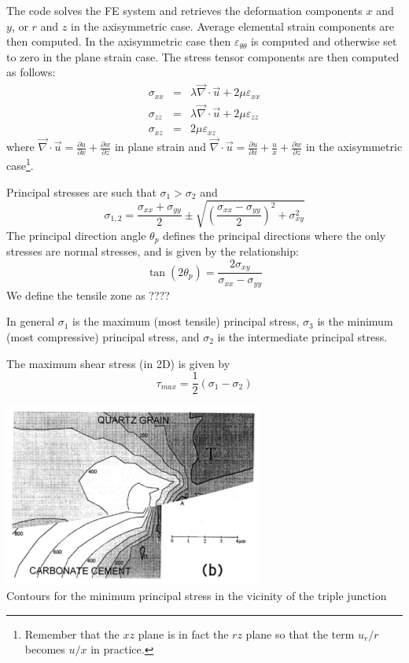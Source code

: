 The code solves the FE system and retrieves the deformation components $x$ and $y$,
or $r$ and $z$ in the axisymmetric case.
Average elemental strain components are then computed. In the axisymmetric case
then  $\varepsilon_{\theta\theta}$ is computed and otherwise set to zero in the plane strain case.
The stress tensor components are then computed as follows:
\begin{eqnarray}
\sigma_{xx} &=& \lambda \vec\nabla\cdot\vec{u} + 2\mu \varepsilon_{xx} \\
\sigma_{zz} &=& \lambda \vec\nabla\cdot\vec{u} + 2\mu \varepsilon_{zz} \\
\sigma_{xz} &=&  2\mu \varepsilon_{xz} 
\end{eqnarray}
where $\vec\nabla\cdot\vec{u}=\frac{\partial u}{\partial x} + \frac{\partial w}{\partial z}$
in plane strain and 
$\vec\nabla\cdot\vec{u}=\frac{\partial u}{\partial x} + \frac{u}{x} + \frac{\partial w}{\partial z}$
in the axisymmetric case\footnote{Remember that the $xz$ plane is in fact the $rz$ plane so that 
the term $u_r/r$ becomes $u/x$ in practice.}.

Principal stresses are such that $\sigma_1>\sigma_2$ and 
\[
\sigma_{1,2}=\frac{\sigma_{xx}+\sigma_{yy}}{2} 
\pm \sqrt{  \left(\frac{\sigma_{xx}-\sigma_{yy}}{2}\right)^2 +\sigma_{xy}^2 }
 \]
The principal direction angle $\theta_p$ defines the principal
directions where the only stresses are normal stresses, and 
is given by the relationship:
\[
\tan (2\theta_p) =  \frac{2 \sigma_{xy}}{\sigma_{xx} -\sigma_{yy}}
\]
We define the tensile zone as ????

In general $\sigma_1$ is the maximum (most tensile) principal stress, 
$\sigma_3$ is the minimum (most compressive) principal stress, 
and $\sigma_2$ is the intermediate principal stress.

The maximum shear stress (in 2D) is given by
\[
\tau_{max} = \frac12(\sigma_1-\sigma_2)
\]


\begin{center}
\includegraphics[width=8.5cm]{python_codes/fieldstone_63/images/wowu95c}\\
{\captionfont Contours for the minimum principal stress in the vicinity of the triple junction}
\end{center}

